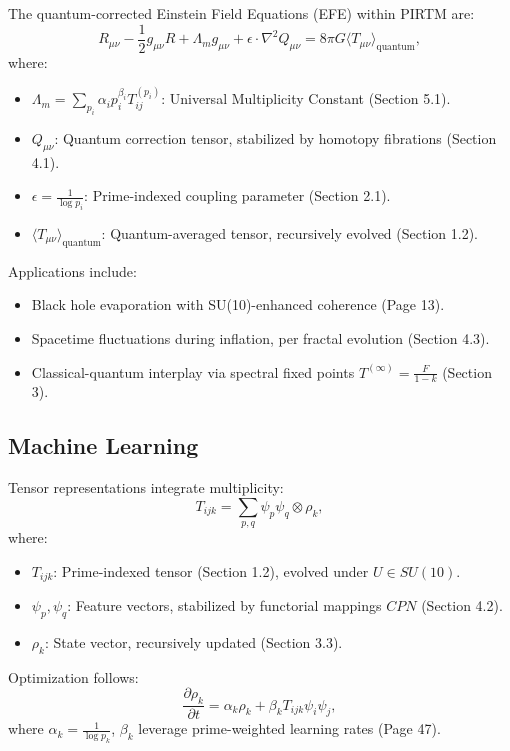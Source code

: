 \documentclass{article}
\theoremstyle{plain}
\begin{document}
The quantum-corrected Einstein Field Equations (EFE) within PIRTM are:
\begin{equation}
R_{\mu\nu} - \frac{1}{2} g_{\mu\nu} R + \Lambda_m g_{\mu\nu} + \epsilon \cdot \nabla^2 Q_{\mu\nu} = 8\pi G \langle T_{\mu\nu} \rangle_{\text{quantum}},
\end{equation}
where:
\begin{itemize}
    \item \( \Lambda_m = \sum_{p_i} \alpha_i p_i^{\beta_i} T_{ij}^{(p_i)} \): Universal Multiplicity Constant (Section 5.1).
    \item \( Q_{\mu\nu} \): Quantum correction tensor, stabilized by homotopy fibrations (Section 4.1).
    \item \( \epsilon = \frac{1}{\log p_i} \): Prime-indexed coupling parameter (Section 2.1).
    \item \( \langle T_{\mu\nu} \rangle_{\text{quantum}} \): Quantum-averaged tensor, recursively evolved (Section 1.2).
\end{itemize}
Applications include:
\begin{itemize}
    \item Black hole evaporation with SU(10)-enhanced coherence (Page 13).
    \item Spacetime fluctuations during inflation, per fractal evolution (Section 4.3).
    \item Classical-quantum interplay via spectral fixed points \( T^{(\infty)} = \frac{F}{1 - k} \) (Section 3).
\end{itemize}

\subsection{Machine Learning}

Tensor representations integrate multiplicity:
\begin{equation}
T_{ijk} = \sum_{p,q} \psi_p \psi_q \otimes \rho_k,
\end{equation}
where:
\begin{itemize}
    \item \( T_{ijk} \): Prime-indexed tensor (Section 1.2), evolved under \( U \in SU(10) \).
    \item \( \psi_p, \psi_q \): Feature vectors, stabilized by functorial mappings \( CPN \) (Section 4.2).
    \item \( \rho_k \): State vector, recursively updated (Section 3.3).
\end{itemize}
Optimization follows:
\begin{equation}
\frac{\partial \rho_k}{\partial t} = \alpha_k \rho_k + \beta_k T_{ijk} \psi_i \psi_j,
\end{equation}
where \( \alpha_k = \frac{1}{\log p_k} \), \( \beta_k \) leverage prime-weighted learning rates (Page 47).
\end{document}
